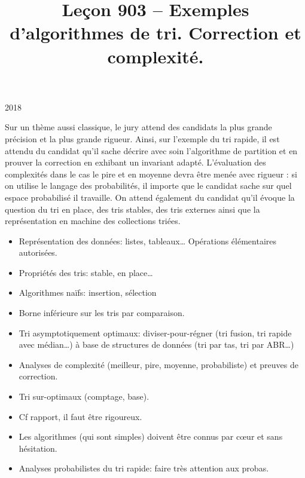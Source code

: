 \documentclass{agregfiche}
\title{Leçon 903 -- Exemples d'algorithmes de tri. Correction et complexité.}
\begin{document}
\maketitle

\secrapports

\begin{rapport}{2018}

Sur un thème aussi classique, le jury attend des candidats la plus grande précision et la plus grande rigueur.
Ainsi, sur l'exemple du tri rapide, il est attendu du candidat qu'il sache décrire avec soin l'algorithme de partition et en prouver la correction en exhibant un invariant adapté. L'évaluation des complexités dans le cas le pire et en moyenne devra être menée avec rigueur : si on utilise le langage des probabilités, il importe que le candidat sache sur quel espace probabilisé il travaille.
On attend également du candidat qu'il évoque la question du tri en place, des tris stables, des tris externes ainsi que la représentation en machine des collections triées.

\end{rapport}

\secindispensables

\begin{itemize}
    \item Représentation des données: listes, tableaux\dots{} Opérations élémentaires autorisées.
    \item Propriétés des tris: stable, en place\dots
    \item Algorithmes naïfs: insertion, sélection
    \item Borne inférieure sur les tris par comparaison.
    \item Tri asymptotiquement optimaux: diviser-pour-régner (tri fusion, tri rapide avec médian\dots) à base de structures de données (tri par tas, tri par ABR\dots)
    \item Analyses de complexité (meilleur, pire, moyenne, probabiliste) et preuves de correction.
    \item Tri sur-optimaux (comptage, base).
\end{itemize}

\secpieges

\begin{itemize}
    \item Cf rapport, il faut être rigoureux.
    \item Les algorithmes (qui sont simples) doivent être connus par c\oe ur et sans hésitation.
    \item Analyses probabilistes du tri rapide: faire très attention aux probas.
\end{itemize}
\end{document}
